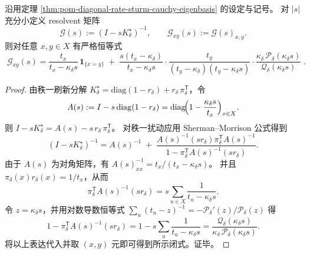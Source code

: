 \begin{proposition}\label{prop:pom-diagonal-rate-resolvent-entry-closed-form}
沿用定理 \ref{thm:pom-diagonal-rate-sturm-cauchy-eigenbasis} 的设定与记号。
对 \(|s|\) 充分小定义 resolvent 矩阵
\[
\mathcal G(s):=(I-sK^\star_\delta)^{-1},
\qquad
\mathcal G_{xy}(s):=\mathcal G(s)_{x,y}.
\]
则对任意 \(x,y\in X\) 有严格恒等式
\[
\boxed{\;
\mathcal G_{xy}(s)
=\frac{t_x}{t_x-\kappa_\delta s}\,\mathbf 1_{\{x=y\}}
\;+\;
\frac{s(t_x-\kappa_\delta)}{t_x-\kappa_\delta s}\cdot
\frac{t_y}{(t_y-\kappa_\delta)(t_y-\kappa_\delta s)}\cdot
\frac{\kappa_\delta\,\mathcal P_\delta(\kappa_\delta s)}{\mathcal Q_\delta(\kappa_\delta s)}\; }.
\]
\end{proposition}
\begin{proof}
由秩一刷新分解 \(K^\star_\delta=\mathrm{diag}(1-r_\delta)+r_\delta\,\pi_\delta^{\mathsf T}\)，令
\[
A(s):=I-s\,\mathrm{diag}(1-r_\delta)=\mathrm{diag}\!\Bigl(1-\frac{\kappa_\delta s}{t_x}\Bigr)_{x\in X}.
\]
则 \(I-sK^\star_\delta=A(s)-s\,r_\delta\,\pi_\delta^{\mathsf T}\)。
对秩一扰动应用 Sherman--Morrison 公式得到
\[
(I-sK^\star_\delta)^{-1}=A(s)^{-1}
\;+\;\frac{A(s)^{-1}(sr_\delta)\pi_\delta^{\mathsf T}A(s)^{-1}}{1-\pi_\delta^{\mathsf T}A(s)^{-1}(sr_\delta)}.
\]
由于 \(A(s)\) 为对角矩阵，有
\(
A(s)^{-1}_{xx}=t_x/(t_x-\kappa_\delta s)
\)。
并且 \(\pi_\delta(x)r_\delta(x)=1/t_x\)，从而
\[
\pi_\delta^{\mathsf T}A(s)^{-1}(sr_\delta)
=s\sum_{u\in X}\frac{1}{t_u-\kappa_\delta s}.
\]
令 \(z=\kappa_\delta s\)，并用对数导数恒等式
\(
\sum_{u}(t_u-z)^{-1}=-\mathcal P_\delta'(z)/\mathcal P_\delta(z)
\)
得
\[
1-\pi_\delta^{\mathsf T}A(s)^{-1}(sr_\delta)
=1-s\sum_{u}\frac{1}{t_u-\kappa_\delta s}
=\frac{\mathcal Q_\delta(\kappa_\delta s)}{\kappa_\delta\,\mathcal P_\delta(\kappa_\delta s)}.
\]
将以上表达代入并取 \((x,y)\) 元即可得到所示闭式。证毕。
\end{proof}

